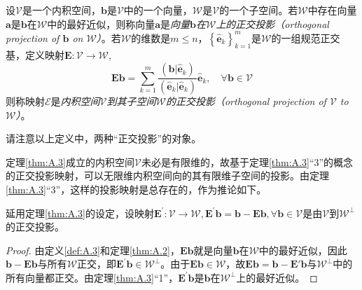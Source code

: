\documentclass[main.tex]{subfiles}
\begin{document}
\begin{definition}[正交投影]\label{def:A.5}
    设$\mathcal{V}$是一个内积空间，$\mathbf{b}$是$\mathcal{V}$中的一个向量，$\mathcal{W}$是$\mathcal{V}$的一个子空间。若$\mathcal{W}$中存在向量$\mathbf{a}$是$\mathbf{b}$在$\mathcal{W}$中的最好近似，则称向量$\mathbf{a}$是\emph{向量$\mathbf{b}$在$\mathcal{W}$上的正交投影（orthogonal projection of $\mathbf{b}$ on $\mathcal{W}$）}。若$\mathcal{W}$的维数是$m\leq n$，$\left\{\mathbf{\hat{e}}_k\right\}_{k=1}^m$是$\mathcal{W}$的一组规范正交基，定义映射$\mathbf{E}:\mathcal{V}\to\mathcal{W}$,
    \[\mathbf{Eb}=\sum_{k=1}^m\frac{\left(\mathbf{b}|\mathbf{\hat{e}}_k\right)}{\left(\mathbf{\hat{e}}_k|\mathbf{\hat{e}}_k\right)}\mathbf{\hat{e}}_k,\quad\forall\mathbf{b}
        \in\mathcal{V}\]
    则称映射$\mathcal{E}$是\emph{内积空间$\mathcal{V}$到其子空间$\mathcal{W}$的正交投影（orthogonal projection of $\mathcal{V}$ to $\mathcal{W}$）}。
\end{definition}

请注意以上定义中，两种“正交投影”的对象。

定理\ref{thm:A.3}成立的内积空间$\mathcal{V}$未必是有限维的，故基于定理\ref{thm:A.3}“3”的概念的正交投影映射，可以无限维内积空间向的其有限维子空间的投影。由定理\ref{thm:A.3}“3”，这样的投影映射是总存在的，作为推论如下。

\begin{corollary}
    延用定理\ref{thm:A.3}的设定，设映射$\mathbf{E^\prime}:\mathcal{V}\to\mathcal{W},\mathbf{E}^\prime\mathbf{b}=\mathbf{b}-\mathbf{Eb},\forall\mathbf{b}\in\mathcal{V}$是由$\mathcal{V}$到$\mathcal{W}^\perp$的正交投影。
\end{corollary}
\begin{proof}
    由定义\ref{def:A.3}和定理\ref{thm:A.2}，$\mathbf{Eb}$就是向量$\mathbf{b}$在$\mathcal{W}$中的最好近似，因此$\mathbf{b}-\mathbf{Eb}$与所有$\mathcal{W}$正交，即$\mathbf{E}^\prime\mathbf{b}\in\mathcal{W}^\perp$。由于$\mathbf{Eb}\in\mathcal{W}$，故$\mathbf{Eb}=\mathbf{b}-\mathbf{E}\prime\mathbf{b}$与$\mathcal{W}^\perp$中的所有向量都正交。由定理\ref{thm:A.3}“1”，$\mathbf{E}^\prime\mathbf{b}$是$\mathbf{b}$在$\mathcal{W}^\perp$上的最好近似。
\end{proof}
\end{document}
